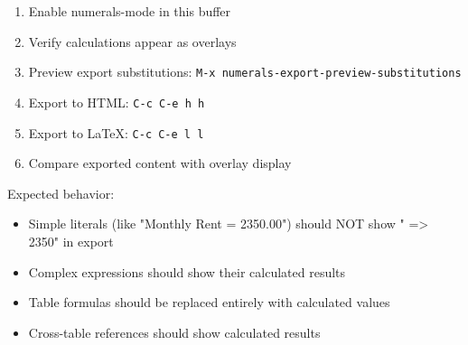\documentclass[11pt]{article}
\begin{document}
\begin{enumerate}
\item Enable numerals-mode in this buffer
\item Verify calculations appear as overlays
\item Preview export substitutions: \texttt{M-x numerals-export-preview-substitutions}
\item Export to HTML: \texttt{C-c C-e h h}
\item Export to \LaTeX{}: \texttt{C-c C-e l l}
\item Compare exported content with overlay display
\end{enumerate}

Expected behavior:
\begin{itemize}
\item Simple literals (like "Monthly Rent = 2350.00") should NOT show " => 2350" in export
\item Complex expressions should show their calculated results
\item Table formulas should be replaced entirely with calculated values
\item Cross-table references should show calculated results
\end{itemize}
\end{document}
